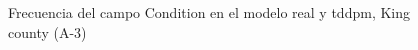 \begin{figure}[H]
    \centering
    
    \caption{Frecuencia del campo Condition en el modelo real y tddpm, King county (A-3)}
    \label{frecuency-tddpm-condition}
\end{figure}